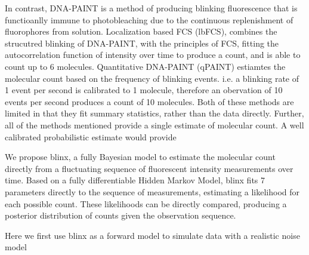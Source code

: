 In contrast, DNA-PAINT is a method of producing blinking fluorescence that is functioanlly
    immune to photobleaching due to the continuous replenishment of fluorophores from solution.
    Localization based FCS (lbFCS), combines the strucutred blinking of DNA-PAINT, with the 
    principles of FCS, fitting the autocorrelation function of intensity over time to produce a count,
    and is able to count up to 6 molecules.
    Quantitative DNA-PAINT (qPAINT) estiamtes the molecular count based on the frequency of blinking events. i.e.
    a blinking rate of 1 event per second is calibrated to 1 molecule, therefore an obervation of 10 events per second
    produces a count of 10 molecules.
    Both of these methods are limited in that they fit summary statistics,
    rather than the data directly. 
    Further, all of the methods mentioned provide a single estimate of molecular count.
    A well calibrated probabilistic estimate would provide 
    
We propose blinx, a fully Bayesian model to estimate the molecular 
  count directly from a fluctuating sequence of fluorescent intensity measurements over time.
  Based on a fully differentiable Hidden Markov Model, blinx fits 7 parameters
  directly to the sequence of measurements, estimating a likelihood for each possible count. 
  These likelihoods can be directly compared, producing a posterior distribution of counts 
  given the observation sequence. 

Here we first use blinx as a forward model to simulate data with a realistic noise model
